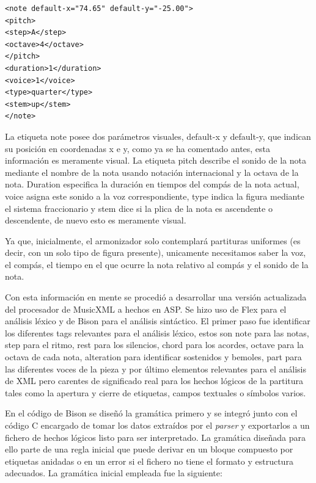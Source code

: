 \begin{verbatim}
<note default-x="74.65" default-y="-25.00">
<pitch>
<step>A</step>
<octave>4</octave>
</pitch>
<duration>1</duration>
<voice>1</voice>
<type>quarter</type>
<stem>up</stem>
</note>
\end{verbatim}

La etiqueta note posee dos parámetros visuales, default-x y default-y,  que indican su posición en coordenadas x e y, como ya se ha comentado antes, esta información es meramente visual. La etiqueta pitch describe el sonido de la nota mediante el nombre de la nota usando notación internacional y la octava de la nota. Duration especifica la duración en tiempos del compás de la nota actual, voice asigna este sonido a la voz correspondiente, type indica la figura mediante el sistema fraccionario y stem dice si la plica de la nota es ascendente o descendente, de nuevo esto es meramente visual.

Ya que, inicialmente, el armonizador solo contemplará partituras uniformes (es decir, con un solo tipo de figura presente), unicamente necesitamos saber la voz, el compás, el tiempo en el que ocurre la nota relativo al compás y el sonido de la nota.

Con esta información en mente se procedió a desarrollar una versión actualizada del procesador de MusicXML a hechos en ASP. Se hizo uso de Flex para el análisis léxico y de Bison para el análisis sintáctico. El primer paso fue identificar los diferentes tags relevantes para el análisis léxico, estos son note para las notas, step para el ritmo, rest para los silencios, chord para los acordes, octave para la octava de cada nota, alteration para identificar sostenidos y bemoles, part para las diferentes voces de la pieza y por último elementos relevantes para el análisis de XML pero carentes de significado real para los hechos lógicos de la partitura tales como la apertura y cierre de etiquetas, campos textuales o símbolos varios.

En el código de Bison se diseñó la gramática primero y se integró junto con el código C encargado de tomar los datos extraídos por el \textit{parser} y exportarlos a un fichero de hechos lógicos listo para ser interpretado. La gramática diseñada para ello parte de una regla inicial que puede derivar en un bloque compuesto por etiquetas anidadas o en un error si el fichero no tiene el formato y estructura adecuados. La gramática inicial empleada fue la siguiente:

